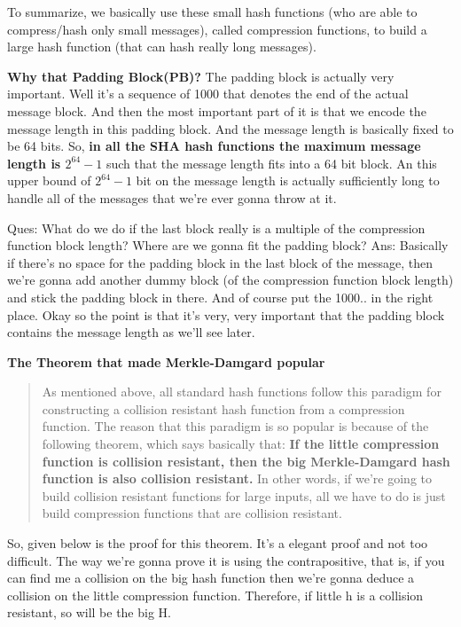 \documentclass[11pt]{article}
\begin{document}
To summarize, we basically use these small hash functions (who are able
to compress/hash only small messages), called compression functions, to
build a large hash function (that can hash really long messages).

\textbf{Why that Padding Block(PB)?} The padding block is actually very
important. Well it's a sequence of 1000 that denotes the end of the
actual message block. And then the most important part of it is that we
encode the message length in this padding block. And the message length
is basically fixed to be 64 bits. So, \textbf{in all the SHA hash
functions the maximum message length is \(2^{64} - 1\)} such that the
message length fits into a 64 bit block. An this upper bound of
\(2^{64} - 1\) bit on the message length is actually sufficiently long
to handle all of the messages that we're ever gonna throw at it.

Ques: What do we do if the last block really is a multiple of the
compression function block length? Where are we gonna fit the padding
block? Ans: Basically if there's no space for the padding block in the
last block of the message, then we're gonna add another dummy block (of
the compression function block length) and stick the padding block in
there. And of course put the 1000.. in the right place. Okay so the
point is that it's very, very important that the padding block contains
the message length as we'll see later.

\textbf{The Theorem that made Merkle-Damgard popular}

\begin{quote}
As mentioned above, all standard hash functions follow this paradigm for
constructing a collision resistant hash function from a compression
function. The reason that this paradigm is so popular is because of the
following theorem, which says basically that: \textbf{If the little
compression function is collision resistant, then the big Merkle-Damgard
hash function is also collision resistant.} In other words, if we're
going to build collision resistant functions for large inputs, all we
have to do is just build compression functions that are collision
resistant.
\end{quote}

So, given below is the proof for this theorem. It's a elegant proof and
not too difficult. The way we're gonna prove it is using the
contrapositive, that is, if you can find me a collision on the big hash
function then we're gonna deduce a collision on the little compression
function. Therefore, if little h is a collision resistant, so will be
the big H.
\end{document}

